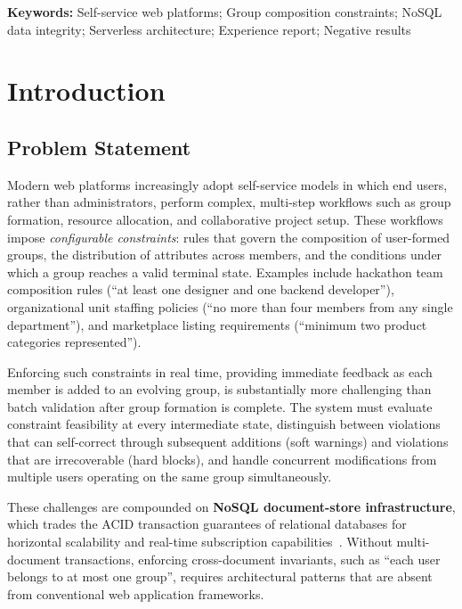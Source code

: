 \documentclass[11pt,a4paper]{article}
\theoremstyle{plain}
\theoremstyle{definition}
\theoremstyle{remark}
\begin{document}
\medskip
\noindent\textbf{Keywords:} Self-service web platforms; Group composition constraints; NoSQL data integrity; Serverless architecture; Experience report; Negative results

\section{Introduction}
\label{sec:introduction}

\subsection{Problem Statement}

Modern web platforms increasingly adopt self-service models in which end users, rather than administrators, perform complex, multi-step workflows such as group formation, resource allocation, and collaborative project setup. These workflows impose \emph{configurable constraints}: rules that govern the composition of user-formed groups, the distribution of attributes across members, and the conditions under which a group reaches a valid terminal state. Examples include hackathon team composition rules (``at least one designer and one backend developer''), organizational unit staffing policies (``no more than four members from any single department''), and marketplace listing requirements (``minimum two product categories represented'').

Enforcing such constraints in real time, providing immediate feedback as each member is added to an evolving group, is substantially more challenging than batch validation after group formation is complete. The system must evaluate constraint feasibility at every intermediate state, distinguish between violations that can self-correct through subsequent additions (soft warnings) and violations that are irrecoverable (hard blocks), and handle concurrent modifications from multiple users operating on the same group simultaneously.

These challenges are compounded on \textbf{NoSQL document-store infrastructure}, which trades the ACID transaction guarantees of relational databases for horizontal scalability and real-time subscription capabilities~\cite{cattell2010, vogels2009, han2011}. Without multi-document transactions, enforcing cross-document invariants, such as ``each user belongs to at most one group'', requires architectural patterns that are absent from conventional web application frameworks.
\end{document}
